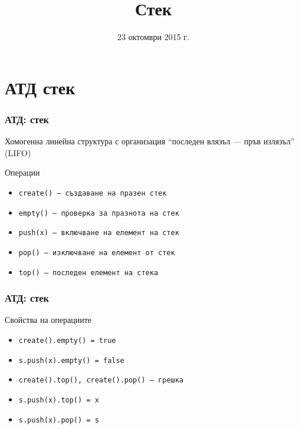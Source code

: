 \documentclass{beamer}
\title{Стек}
\date{23 октомври 2015 г.}
\begin{document}
\begin{frame}
  \titlepage
\end{frame}

\section{АТД стек}

\begin{frame}
  \frametitle{АТД: стек}

  Хомогенна линейна структура с организация ``последен влязъл --- пръв излязъл'' (LIFO)
  \vspace{1em}

  Операции
  \vspace{0.5em}
  \begin{itemize}
  \item \tt{create()} --- създаване на празен стек
  \item \tt{empty()} --- проверка за празнота на стек
  \item \tt{push(x)} --- включване на елемент на стек
  \item \tt{pop()} --- изключване на елемент от стек
  \item \tt{top()} --- последен елемент на стека
  \end{itemize}
\end{frame}

\begin{frame}
  \frametitle{АТД: стек}

  Свойства на операциите
  \vspace{0.5em}

  \begin{itemize}
  \item \tt{create().empty()} = \tt{true}
  \item \tt{s.push(x).empty()} = \tt{false}
  \item \tt{create().top()}, \tt{create().pop()} --- \alert{грешка}
  \item \tt{s.push(x).top()} = \tt x
  \item \tt{s.push(x).pop()} = \tt s
  \end{itemize}
\end{frame}
\end{document}
